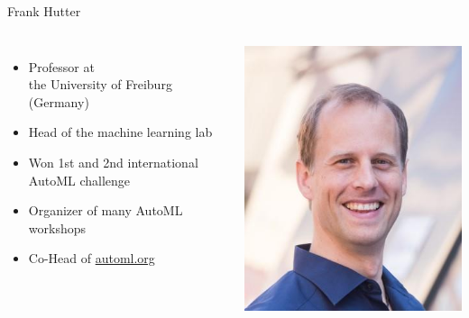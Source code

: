 \begin{frame}[c]{Frank Hutter}

\begin{columns}
	

\begin{itemize}
	\item Professor at\\ the University of Freiburg (Germany)
	\item Head of the machine learning lab
	\item Won 1st and 2nd international AutoML challenge
	\item Organizer of many AutoML workshops 
	\item Co-Head of \url{automl.org}
\end{itemize}


\includegraphics[width=1.0\textwidth]{images/hutter.jpg}
	
\end{columns}

\end{frame}

